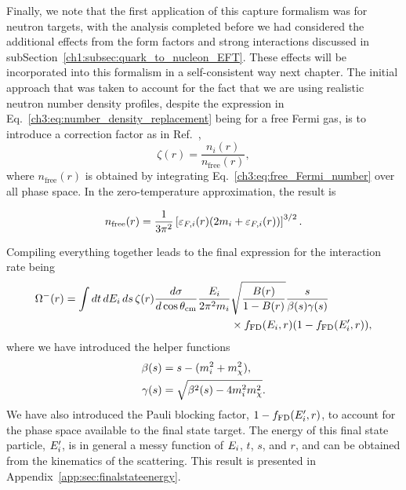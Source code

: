 Finally, we note that the first application of this capture formalism was for neutron targets, with the analysis completed before we had considered the additional effects from the form factors and strong interactions discussed in subSection~\ref{ch1:subsec:quark_to_nucleon_EFT}. These effects will be incorporated into this formalism in a self-consistent way next chapter. The initial approach that was taken to account for the fact that we are using realistic neutron number density profiles, despite the expression in Eq.~\ref{ch3:eq:number_density_replacement} being for a free Fermi gas, is to introduce a correction factor as in Ref.~\cite{Garani:2018kkd_may_NewAnalysisNeutron},
\begin{equation}
    \zeta(r) = \frac{n_i(r)}{n_\mathrm{free}(r)},
\end{equation}
where $n_\mathrm{free}(r)$ is obtained by integrating Eq.~\ref{ch3:eq:free_Fermi_number} over all phase space. In the zero-temperature approximation, the result is

\begin{equation}
    n_\mathrm{free}(r) = \frac{1}{3\pi^2}\left[ \varepsilon_{F,i}(r)(2m_i + \varepsilon_{F,i}(r))\right]^{3/2}.
    \label{ch3:eq:n_free_Fermi}
\end{equation}

Compiling everything together leads to the final expression for the interaction rate being
\begin{equation}
    \begin{split}
        \Omega^-(r) = \int dt\,dE_i\,ds\,\zeta(r) \frac{d\sigma}{d\cos\theta_\mathrm{cm}}\frac{E_i}{2\pi^2 m_i}&\sqrt{\frac{B(r)}{1 - B(r)}} \frac{s}{\beta(s)\gamma(s)}\\
        &\times f_{\rm FD}(E_i, r)(1 - f_{\rm FD}(E_i', r)),
    \end{split}
    \label{ch3:eq:int_rate_capture_full}
\end{equation}
where we have introduced the helper functions
\begin{align}
    \beta(s) & = s - (m_i^2 + m_\chi^2), \label{ch3:eq:beta_func}\\
    \gamma(s) & = \sqrt{\beta^2(s) - 4 m_i^2 m_\chi^2}.\label{ch3:eq:gamma_func}
\end{align}
We have also introduced the Pauli blocking factor, $1 - f_{\rm FD}(E_i', r)$, to account for the phase space available to the final state target. The energy of this final state particle, $E_i'$, is in general a messy function of $E_i$, $t$, $s$, and $r$, and can be obtained from the kinematics of the scattering. This result is presented in Appendix~\ref{app:sec:finalstateenergy}.

